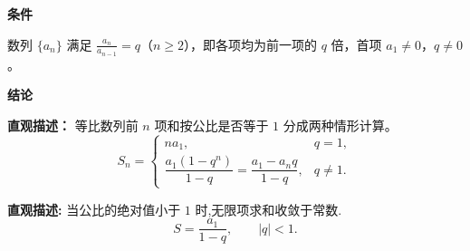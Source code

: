 \begin{statementbox}

\textbf{\textcolor{CStatement}{条件}}
\begin{description}[style=nextline, leftmargin=2.8em, labelsep=0.5em, itemsep=0.35em]
    \item[\textbf{\textcolor{CStatement}{条件 1（等比定义）：}}] 数列 $\{a_n\}$ 满足 $\frac{a_{n}}{a_{n-1}} = q$（$n\ge 2$），即各项均为前一项的 $q$ 倍，首项 $a_1\neq 0$，$q\neq 0$。
\end{description}

\textbf{\textcolor{CStatement}{结论}}
\begin{description}[style=nextline, leftmargin=2.8em, labelsep=0.5em, itemsep=0.45em]
    \item[\textbf{\textcolor{CStatement}{结论一（分段求和）：}}]
    \textbf{\textcolor{CStatement}{直观描述：}} 等比数列前 $n$ 项和按公比是否等于 $1$ 分成两种情形计算。
    \[
    S_n=
    \begin{cases}
    n a_1, & q=1,\\[6pt]
    \dfrac{a_1(1-q^n)}{1-q}
    =\dfrac{a_1-a_n q}{1-q}, & q\neq 1.
    \end{cases}
    \]

    \item[\textbf{\textcolor{CStatement}{推广结论(无穷项和):}}]
    \textbf{\textcolor{CStatement}{直观描述:}} 当公比的绝对值小于 $1$ 时,无限项求和收敛于常数.
    \[
    S = \frac{a_1}{1-q},\qquad |q|<1.
    \]
\end{description}

\end{statementbox}
